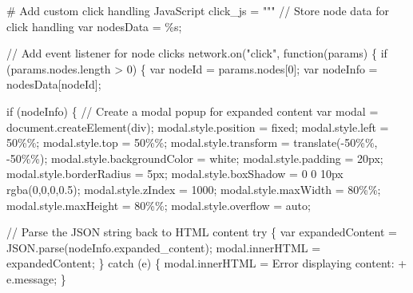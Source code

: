 \documentclass[
  11pt,
  letterpaper,
  openany]{book}
\newenvironment{Shaded}{\begin{snugshade}}{\end{snugshade}}
\newcommand{\CommentTok}[1]{\textcolor[rgb]{0.37,0.37,0.37}{#1}}
\newcommand{\NormalTok}[1]{\textcolor[rgb]{0.00,0.23,0.31}{#1}}
\newcommand{\OperatorTok}[1]{\textcolor[rgb]{0.37,0.37,0.37}{#1}}
\newcommand{\SpecialCharTok}[1]{\textcolor[rgb]{0.37,0.37,0.37}{#1}}
\newcommand{\StringTok}[1]{\textcolor[rgb]{0.13,0.47,0.30}{#1}}
\begin{document}
\begin{landscape}
\begin{Shaded}
\begin{Highlighting}[]
    \CommentTok{\# Add custom click handling JavaScript}
\NormalTok{    click\_js }\OperatorTok{=} \StringTok{"""}
\StringTok{    // Store node data for click handling}
\StringTok{    var nodesData = }\SpecialCharTok{\%s}\StringTok{;}

\StringTok{    // Add event listener for node clicks}
\StringTok{    network.on("click", function(params) \{}
\StringTok{        if (params.nodes.length \textgreater{} 0) \{}
\StringTok{            var nodeId = params.nodes[0];}
\StringTok{            var nodeInfo = nodesData[nodeId];}

\StringTok{            if (nodeInfo) \{}
\StringTok{                // Create a modal popup for expanded content}
\StringTok{                var modal = document.createElement(\textquotesingle{}div\textquotesingle{});}
\StringTok{                modal.style.position = \textquotesingle{}fixed\textquotesingle{};}
\StringTok{                modal.style.left = \textquotesingle{}50}\SpecialCharTok{\%\%}\StringTok{\textquotesingle{};}
\StringTok{                modal.style.top = \textquotesingle{}50}\SpecialCharTok{\%\%}\StringTok{\textquotesingle{};}
\StringTok{                modal.style.transform = \textquotesingle{}translate({-}50}\SpecialCharTok{\%\%}\StringTok{, {-}50}\SpecialCharTok{\%\%}\StringTok{)\textquotesingle{};}
\StringTok{                modal.style.backgroundColor = \textquotesingle{}white\textquotesingle{};}
\StringTok{                modal.style.padding = \textquotesingle{}20px\textquotesingle{};}
\StringTok{                modal.style.borderRadius = \textquotesingle{}5px\textquotesingle{};}
\StringTok{                modal.style.boxShadow = \textquotesingle{}0 0 10px rgba(0,0,0,0.5)\textquotesingle{};}
\StringTok{                modal.style.zIndex = \textquotesingle{}1000\textquotesingle{};}
\StringTok{                modal.style.maxWidth = \textquotesingle{}80}\SpecialCharTok{\%\%}\StringTok{\textquotesingle{};}
\StringTok{                modal.style.maxHeight = \textquotesingle{}80}\SpecialCharTok{\%\%}\StringTok{\textquotesingle{};}
\StringTok{                modal.style.overflow = \textquotesingle{}auto\textquotesingle{};}

\StringTok{                // Parse the JSON string back to HTML content}
\StringTok{                try \{}
\StringTok{                    var expandedContent = JSON.parse(nodeInfo.expanded\_content);}
\StringTok{                    modal.innerHTML = expandedContent;}
\StringTok{                \} catch (e) \{}
\StringTok{                    modal.innerHTML = \textquotesingle{}Error displaying content: \textquotesingle{} + e.message;}
\StringTok{                \}}


\end{Highlighting}
\end{Shaded}
\end{landscape}
\end{document}
